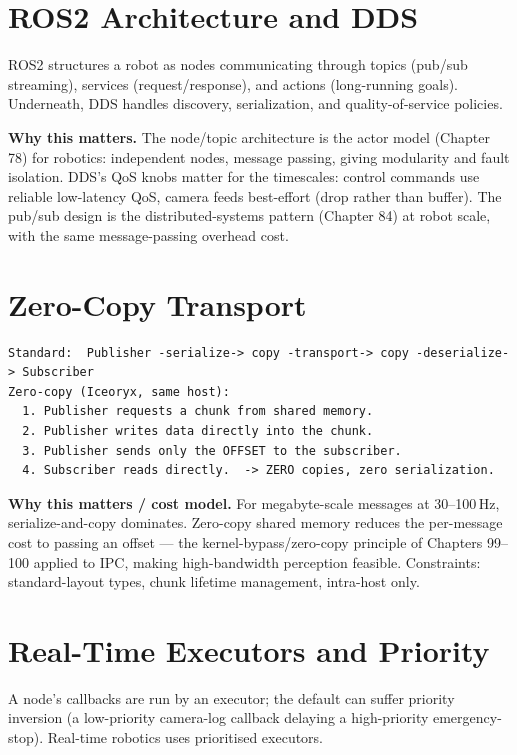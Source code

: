 \section{ROS2 Architecture and DDS}
ROS2 structures a robot as nodes communicating through topics (pub/sub streaming), services (request/response), and actions (long-running goals). Underneath, DDS handles discovery, serialization, and quality-of-service policies.

\textbf{Why this matters.} The node/topic architecture is the actor model (Chapter 78) for robotics: independent nodes, message passing, giving modularity and fault isolation. DDS's QoS knobs matter for the timescales: control commands use reliable low-latency QoS, camera feeds best-effort (drop rather than buffer). The pub/sub design is the distributed-systems pattern (Chapter 84) at robot scale, with the same message-passing overhead cost.

\section{Zero-Copy Transport}
\begin{lstlisting}[language=text, caption={Zero-copy transport via shared memory: publish a pointer, not the data.}]
Standard:  Publisher -serialize-> copy -transport-> copy -deserialize-> Subscriber
Zero-copy (Iceoryx, same host):
  1. Publisher requests a chunk from shared memory.
  2. Publisher writes data directly into the chunk.
  3. Publisher sends only the OFFSET to the subscriber.
  4. Subscriber reads directly.  -> ZERO copies, zero serialization.
\end{lstlisting}

\textbf{Why this matters / cost model.} For megabyte-scale messages at 30--100\,Hz, serialize-and-copy dominates. Zero-copy shared memory reduces the per-message cost to passing an offset --- the kernel-bypass/zero-copy principle of Chapters 99--100 applied to IPC, making high-bandwidth perception feasible. Constraints: standard-layout types, chunk lifetime management, intra-host only.

\section{Real-Time Executors and Priority}
A node's callbacks are run by an executor; the default can suffer priority inversion (a low-priority camera-log callback delaying a high-priority emergency-stop). Real-time robotics uses prioritised executors.

